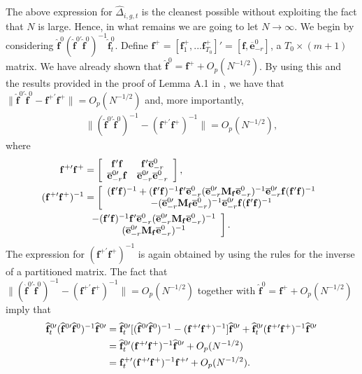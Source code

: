 \documentclass[12pt,fleqn]{article}
\def\*#1{\mathbf{#1}}
\begin{document}
The above expression for $\widehat \Delta_{i,g,t}$ is the cleanest possible without exploiting the fact that $N$ is large. Hence, in what remains we are going to let $N\to\infty$. We begin by considering $\widehat{\*f}^{0} (\widehat{\*f}^{0\prime}\widehat{\*f}^0)^{-1}\widehat{\*f}_t^0$. Define $\*f^+ = [\*f_1^+,... \*f_{T_0}^+]' = [\*f, \overline{\*e}_{-r}^{0}]$, a $T_0\times (m+1)$ matrix. We have already shown that $\widehat{\*{f}}^0 = \*f^+ +  O_p(N^{-1/2})$. By using this and the results provided in the proof of Lemma A.1 in \citet{westerlund2019cce}, we have that $\|\widehat{\*f}^{0\prime}\widehat{\*f}^0 - \*f^{+\prime}\*f^+\|= O_p(N^{-1/2})$ and, more importantly,
\begin{align}
\|(\widehat{\*f}^{0\prime}\widehat{\*f}^0 )^{-1} - (\*f^{+\prime}\*f^+)^{-1}\| = O_p(N^{-1/2}),
\end{align}
where
\begin{align}
\*f^{+\prime}\*f^+ &= \left[\begin{array}{cc} \*f'\*f & \*f'\overline{\*e}_{-r}^0 \\ \overline{\*e}_{-r}^{0\prime}\*f  & \overline{\*e}_{-r}^{0\prime}\overline{\*e}_{-r}^0 \end{array}\right] ,\\
(\*f^{+\prime}\*f^+)^{-1} &= \left[\begin{array}{c} (\*f'\*f)^{-1} + (\*f'\*f)^{-1}\*f'\overline{\*e}_{-r}^0(\overline{\*e}_{-r}^{0\prime}\*M_{\*f}\overline{\*e}_{-r}^0)^{-1}\overline{\*e}_{-r}^{0\prime} \*f(\*f'\*f)^{-1}  \\
-(\overline{\*e}_{-r}^{0\prime}\*M_{\*f}\overline{\*e}_{-r}^0)^{-1}\overline{\*e}_{-r}^{0\prime}\*f (\*f'\*f)^{-1} \end{array}\right. \notag\\
& \left. \begin{array}{c}  -(\*f'\*f)^{-1}\*f'\overline{\*e}_{-r}^0(\overline{\*e}_{-r}^{0\prime}\*M_{\*f}\overline{\*e}_{-r}^0)^{-1} \\
 (\overline{\*e}_{-r}^{0\prime}\*M_{\*f}\overline{\*e}_{-r}^0)^{-1} \end{array}\right].
\end{align}
The expression for $(\*f^{+\prime}\*f^+)^{-1}$ is again obtained by using the rules for the inverse of a partitioned matrix. The fact that $\|(\widehat{\*f}^{0\prime}\widehat{\*f}^0 )^{-1} - (\*f^{+\prime}\*f^+)^{-1}\| = O_p(N^{-1/2})$ together with $\widehat{\*{f}}^0 = \*f^+ +  O_p(N^{-1/2})$ imply that
\begin{align}
\widehat{\*f}_t^{0\prime}(\widehat{\*f}^{0\prime}\widehat{\*f}^0)^{-1}\widehat{\*f}^{0\prime} & =  \widehat{\*f}_t^{0\prime}[(\widehat{\*f}^{0\prime}\widehat{\*f}^0)^{-1} - (\*f^{+\prime}\*f^+)^{-1} ]\widehat{\*f}^{0\prime} + \widehat{\*f}_t^{0\prime}(\*f^{+\prime}\*f^+)^{-1}\widehat{\*f}^{0\prime} \notag\\
& = \widehat{\*f}_t^{0\prime}(\*f^{+\prime}\*f^+)^{-1}\widehat{\*f}^{0\prime} + O_p(N^{-1/2})\notag\\
& = \*f_t^{+\prime}(\*f^{+\prime}\*f^+)^{-1}\*f^{+\prime} + O_p(N^{-1/2}).
\end{align}
\end{document}
